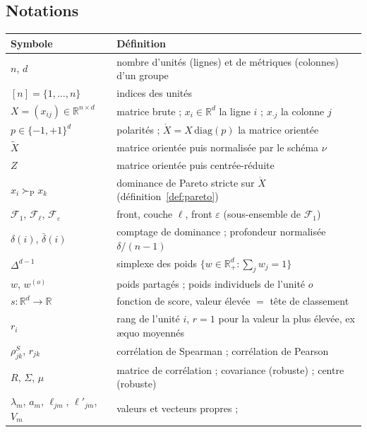 \documentclass[11pt,a4paper]{article}
\theoremstyle{definition}
\theoremstyle{remark}
\newcommand{\R}{\mathbb{R}}
\newcommand{\simplex}{\Delta^{d-1}}
\newcommand{\pareto}{\succ_{\mathrm{P}}}
\newcommand{\Xor}{\mathring{X}}
\begin{document}
\bigskip

\subsection{Notations}

\medskip

\begin{table}[htbp]
  \centering
  \small
  \renewcommand{\arraystretch}{1.2}
  \begin{tabularx}{\textwidth}{@{}l X@{}}
    \toprule
    \textbf{Symbole} & \textbf{Définition} \\
    \midrule
    $n$, $d$ & nombre d'unités (lignes) et de métriques (colonnes) d'un groupe \\
    $[n] = \{1,\dots,n\}$ & indices des unités \\
    $X = (x_{ij}) \in \R^{n\times d}$ & matrice brute ; $x_i \in \R^d$ la ligne $i$ ;
      $x_{\cdot j}$ la colonne $j$ \\
    $p \in \{-1,+1\}^d$ & polarités ; $\Xor = X\,\mathrm{diag}(p)$ la matrice orientée \\
    $\tilde{X}$ & matrice orientée puis normalisée par le schéma $\nu$ \\
    $Z$ & matrice orientée puis centrée-réduite \\
    $x_i \pareto x_k$ & dominance de Pareto stricte sur $\Xor$
      (définition~\ref{def:pareto}) \\
    $\mathcal{F}_1$, $\mathcal{F}_\ell$, $\mathcal{F}_\varepsilon$ & front, couche $\ell$,
      front $\varepsilon$ (sous-ensemble de $\mathcal{F}_1$) \\
    $\delta(i)$, $\bar\delta(i)$ & comptage de dominance ; profondeur normalisée
      $\delta/(n-1)$ \\
    $\simplex$ & simplexe des poids
      $\{w \in \R_+^d : \sum_j w_j = 1\}$ \\
    $w$, $w^{(o)}$ & poids partagés ; poids individuels de l'unité $o$ \\
    $s : \R^d \to \R$ & fonction de score, valeur élevée $=$ tête de classement \\
    $r_i$ & rang de l'unité $i$, $r = 1$ pour la valeur la plus élevée, ex \ae quo moyennés \\
    $\rho^S_{jk}$, $r_{jk}$ & corrélation de Spearman ; corrélation de Pearson \\
    $R$, $\Sigma$, $\mu$ & matrice de corrélation ; covariance (robuste) ; centre (robuste) \\
    $\lambda_m$, $a_m$, $\ell_{jm}$, $\ell'_{jm}$, $V_m$ & valeurs et vecteurs propres ;

\end{tabularx}
\end{table}
\end{document}
